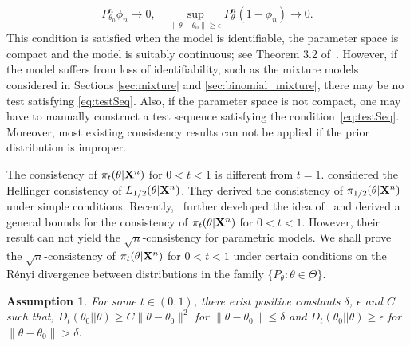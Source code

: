 \documentclass[11pt]{article}
\theoremstyle{plain}
\newtheorem{proposition}{\quad\quad Proposition}
\newtheorem{assumption}{\quad\quad Assumption}
\theoremstyle{definition}
\theoremstyle{remark}
\begin{document}
\begin{equation}\label{eq:testSeq}
    P_{\theta_0}^n\phi_n\to 0,\quad \sup_{\|\theta-\theta_0\|\geq \epsilon} P_\theta^n(1-\phi_n)\to 0.
\end{equation}
This condition is satisfied when the model is identifiable, the parameter space is compact and the model is suitably continuous; see Theorem 3.2 of~\cite{Kleijn2012The}.
However, if the model suffers from loss of identifiability, such as the mixture models considered in Sections \ref{sec:mixture} and \ref{sec:binomial_mixture}, there may be no test satisfying \eqref{eq:testSeq}.
Also, if the parameter space is not compact, one may have to manually construct a test sequence satisfying the condition~\eqref{eq:testSeq}.
Moreover, most existing consistency results can not be applied if the prior distribution is improper.






The consistency of $\pi_t(\theta | \mathbf{X}^{n})$ for $0<t<1$ is different from $t=1$.
\cite{kar10563} considered the Hellinger consistency of $L_{1/2}(\theta | \mathbf{X}^{n})$.
They derived the consistency of $\pi_{1/2}(\theta | \mathbf{X}^{n})$ under simple conditions.
Recently,~\cite{Bha2016} further developed the idea of~\cite{kar10563} and derived a general bounds for the consistency of $\pi_t(\theta | \mathbf{X}^{n})$ for $0<t<1$.
However, their result can not yield the $\sqrt{n}$-consistency for parametric models.
We shall prove the $\sqrt{n}$-consistency of $\pi_{t}(\theta | \mathbf{X}^{n})$ for $0<t<1$ under certain conditions on the R\'{e}nyi divergence between distributions in the family $\{P_\theta:\theta\in\Theta\}$.
\begin{assumption}\label{Assumption4}
    For some $t\in(0,1)$, there exist positive constants $\delta$, $\epsilon$ and $C$ such that,
     $D_{t}(\theta_0||\theta)  \geq  C \|\theta-\theta_0\|^2$ for $\|\theta-\theta_0\|\leq \delta$ and $D_{t}(\theta_0||\theta) \geq \epsilon$ for $\|\theta-\theta_0\|>\delta$.
\end{assumption}
\end{document}
